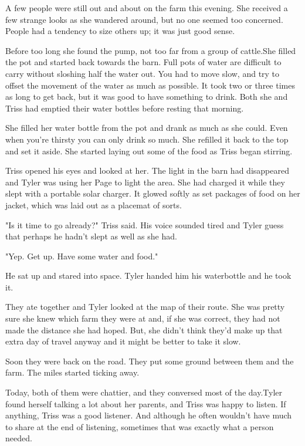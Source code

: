 \documentclass[courier]{sffms}
\begin{document}
A few people were still out and about on the farm this evening.
She received a few strange looks as she wandered around,
but no one seemed too concerned. People had a tendency
to size others up; it was just good sense.

Before too long she found the pump, not too far from a
group of cattle.She filled the pot and started back towards the
barn. Full pots of water are difficult to carry
without sloshing half the water out. You had
to move slow, and try to offset the movement
of the water as much as possible. It took two
or three times as long to get back, but it was
good to have something to drink. Both she and
Triss had emptied their water bottles before
resting that morning.

She filled her water bottle from the pot and
drank as much as she could. Even when you're
thirsty you can only drink so much. She refilled
it back to the top and set it aside. She started
laying out some of the food as Triss began
stirring.

Triss opened his eyes and looked at her. The
light in the barn had disappeared and Tyler
was using her Page to light the area. She had
charged it while they slept with a portable
solar charger. It glowed softly as set packages
of food on her jacket, which was laid out
as a placemat of sorts.

"Is it time to go already?" Triss said. His voice
sounded tired and Tyler guess that perhaps
he hadn't slept as well as she had.

"Yep. Get up. Have some water and food."

He sat up and stared into space. Tyler handed
him his waterbottle and he took it.

They ate together and Tyler looked at the map
of their route. She was pretty sure she knew
which farm they were at and, if she was correct,
they had not made the distance she had hoped.
But, she didn't think they'd make up that extra
day of travel anyway and it might be better to
take it slow.

Soon they were back on the road. They put some
ground between them and the farm. The miles
started ticking away.

Today, both of them were chattier, and they
conversed most of the day.Tyler found herself talking a lot about her
parents, and Triss was happy to listen. If anything,
Triss was a good listener. And although he
often wouldn't have much to share at the
end of listening, sometimes that was exactly what
a person needed.
\end{document}
